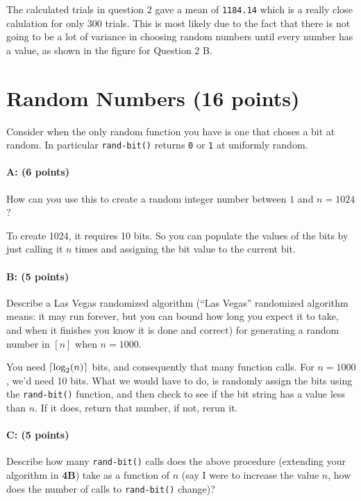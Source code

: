 \documentclass[11pt]{article}
\DeclarePairedDelimiter\ceil{\lceil}{\rceil}
\begin{document}
The calculated trials in question 2 gave a mean of \verb~1184.14~ which is a really close calulation for only 300 trials. This is most likely due to the fact that there is not going to be a lot of variance in choosing random numbers until every number has a value, as shown in the figure for Question 2 B.

\section{Random Numbers (16 points)}

Consider when the only random function you have is one that choses a bit at random.  In particular \texttt{rand-bit()} returns \texttt{0} or \texttt{1} at uniformly random.  

\paragraph{A: (6 points)}
How can you use this to create a random integer number between $1$ and $n=1024$?  

To create 1024, it requires 10 bits. So you can populate the values of the bits by just calling it $n$ times and assigning the bit value to the current bit.


\paragraph{B: (5 points)}
Describe a Las Vegas randomized algorithm (``Las Vegas'' randomized algorithm means: it may run forever, but you can bound how long you expect it to take, and when it finishes you know it is done and correct) for generating a random number in $[n]$ when $n=1000$.  

You need $\ceil{\log_{2}(n)}$ bits, and consequently that many function calls. For $n = 1000$, we'd need 10 bits. What we would have to do, is randomly assign the bits using the \verb~rand-bit()~ function, and then check to see if the bit string has a value less than $n$. If it does, return that number, if not, rerun it.

\paragraph{C: (5 points)}  
Describe how many \texttt{rand-bit()} calls does the above procedure (extending your algorithm in \textbf{4B}) take as a function of $n$ (say I were to increase the value $n$, how does the number of calls to \texttt{rand-bit()} change)?  
\end{document}

